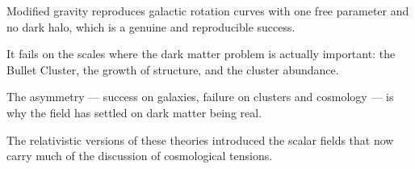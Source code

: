 \begin{keytakeaways}
\item Modified gravity reproduces galactic rotation curves with one free
parameter and no dark halo, which is a genuine and reproducible success.
\item It fails on the scales where the dark matter problem is actually
important: the Bullet Cluster, the growth of structure, and the cluster
abundance.
\item The asymmetry --- success on galaxies, failure on clusters and
cosmology --- is why the field has settled on dark matter being real.
\item The relativistic versions of these theories introduced the scalar
fields that now carry much of the discussion of cosmological tensions.
\end{keytakeaways}
